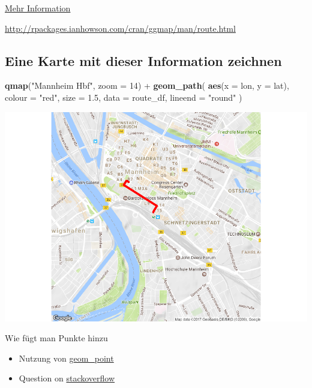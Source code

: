 \documentclass[]{article}
\newenvironment{Shaded}{\begin{snugshade}}{\end{snugshade}}
\newcommand{\KeywordTok}[1]{\textcolor[rgb]{0.13,0.29,0.53}{\textbf{{#1}}}}
\newcommand{\DataTypeTok}[1]{\textcolor[rgb]{0.13,0.29,0.53}{{#1}}}
\newcommand{\DecValTok}[1]{\textcolor[rgb]{0.00,0.00,0.81}{{#1}}}
\newcommand{\FloatTok}[1]{\textcolor[rgb]{0.00,0.00,0.81}{{#1}}}
\newcommand{\StringTok}[1]{\textcolor[rgb]{0.31,0.60,0.02}{{#1}}}
\newcommand{\NormalTok}[1]{{#1}}
\begin{document}
\href{http://rpackages.ianhowson.com/cran/ggmap/man/route.html}{Mehr
Information}

\url{http://rpackages.ianhowson.com/cran/ggmap/man/route.html}

\subsection{Eine Karte mit dieser Information
zeichnen}\label{eine-karte-mit-dieser-information-zeichnen}

\begin{Shaded}
\begin{Highlighting}[]
\KeywordTok{qmap}\NormalTok{(}\StringTok{"Mannheim Hbf"}\NormalTok{, }\DataTypeTok{zoom =} \DecValTok{14}\NormalTok{) +}
\StringTok{  }\KeywordTok{geom_path}\NormalTok{(}
    \KeywordTok{aes}\NormalTok{(}\DataTypeTok{x =} \NormalTok{lon, }\DataTypeTok{y =} \NormalTok{lat),  }\DataTypeTok{colour =} \StringTok{"red"}\NormalTok{, }\DataTypeTok{size =} \FloatTok{1.5}\NormalTok{,}
    \DataTypeTok{data =} \NormalTok{route_df, }\DataTypeTok{lineend =} \StringTok{"round"}
  \NormalTok{)}
\end{Highlighting}
\end{Shaded}

\includegraphics{Intro_Datenanalyse1_files/figure-latex/unnamed-chunk-271-1.pdf}

Wie fügt man Punkte hinzu

\begin{itemize}
\item
  Nutzung von
  \href{http://zevross.com/blog/2014/07/16/mapping-in-r-using-the-ggplot2-package/}{geom\_point}
\item
  Question on
  \href{http://stackoverflow.com/questions/15069963/getting-a-map-with-points-using-ggmap-and-ggplot2}{stackoverflow}
\end{itemize}
\end{document}
